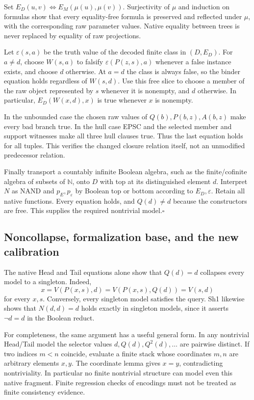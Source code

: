 Set $E_D(u,v)\iff E_M(\mu(u),\mu(v))$.  Surjectivity of $\mu$
and induction on formulas show that every equality-free formula
is preserved and reflected under $\mu$, with the corresponding
raw parameter values.  Native equality between trees is never
replaced by equality of raw projections.

Let $\varepsilon(s,a)$ be the truth value of the decoded finite
class in $(D,E_D)$.  For $a\ne d$, choose $W(s,a)$ to falsify
$\varepsilon(P(z,s),a)$ whenever a false instance exists, and
choose $d$ otherwise.  At $a=d$ the class is always false,
so the binder equation holds regardless of $W(s,d)$.  Use this
free slice to choose a member of the raw object represented by
$s$ whenever it is nonempty, and $d$ otherwise.  In particular,
$E_D(W(x,d),x)$ is true whenever $x$ is nonempty.

In the unbounded case the chosen raw values of
$Q(b),P(b,z),A(b,z)$ make every bad branch true.  In the hull
case EPSC and the selected member and support witnesses make
all three hull clauses true.  Thus the last equation holds for
all tuples.  This verifies the changed closure relation itself,
not an unmodified predecessor relation.

Finally transport a countably infinite Boolean algebra, such as
the finite/cofinite algebra of subsets of $\mathbb N$, onto $D$
with top at its distinguished element $d$.  Interpret $N$ as
NAND and $p_E,p_\varepsilon$ by Boolean top or bottom according
to $E_D,\varepsilon$.  Retain all native functions.  Every equation
holds, and $Q(d)\ne d$ because the constructors are free.
This supplies the required nontrivial model.\hfill$\square$

\subsection{Noncollapse, formalization base, and the new calibration}

The native Head and Tail equations alone show that $Q(d)=d$
collapses every model to a singleton.  Indeed,
\[
 x=V(P(x,s),d)=V(P(x,s),Q(d))=V(s,d)
\]
for every $x,s$.  Conversely, every singleton model satisfies
the query.  Sh1 likewise shows that $N(d,d)=d$ holds exactly
in singleton models, since it asserts $\neg d=d$ in the
Boolean reduct.

For completeness, the same argument has a useful general form.
In any nontrivial Head/Tail model the selector values
$d,Q(d),Q^2(d),\ldots$ are pairwise distinct.  If two indices
$m<n$ coincide, evaluate a finite stack whose coordinates
$m,n$ are arbitrary elements $x,y$.  The coordinate lemma
gives $x=y$, contradicting nontriviality.  In particular no
finite nontrivial structure can model even this native fragment.
Finite regression checks of encodings must not be treated as
finite consistency evidence.

